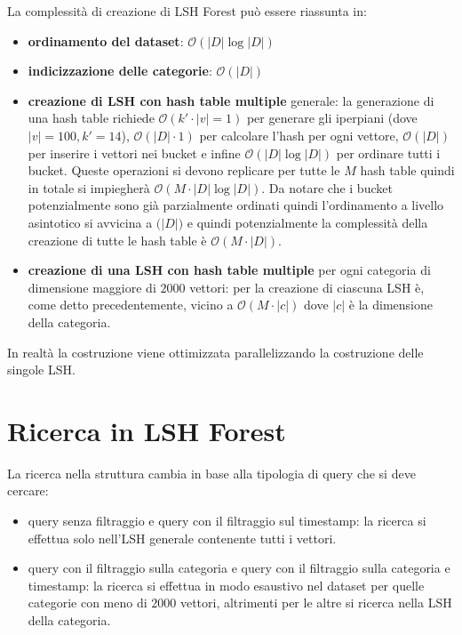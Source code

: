 La complessità di creazione di LSH Forest può essere riassunta in:
\begin{itemize}
    \item \textbf{ordinamento del dataset}: $\mathcal{O}(|D|\log |D|)$
    \item \textbf{indicizzazione delle categorie}: $\mathcal{O}(|D|)$
    \item \textbf{creazione di LSH con hash table multiple} generale: la generazione
    di una hash table richiede $\mathcal{O}(k'\cdot |v|=1)$ per generare gli iperpiani
    (dove $|v| = 100, k' = 14$), $\mathcal{O}(|D|\cdot 1)$ per calcolare l'hash per ogni vettore,
    $\mathcal{O}(|D|)$ per inserire i vettori nei bucket e infine $\mathcal{O}(|D|\log |D|)$
    per ordinare tutti i bucket. Queste operazioni si devono replicare per tutte le 
    $M$ hash table quindi in totale si impiegherà $\mathcal{O}(M\cdot |D|\log |D|)$.
    Da notare che i bucket potenzialmente sono già parzialmente ordinati quindi 
    l'ordinamento a livello asintotico si avvicina a $\mathcal(|D|)$ e quindi 
    potenzialmente la complessità della creazione di tutte le hash table è $\mathcal{O}(M\cdot |D|)$.
    \item \textbf{creazione di una LSH con hash table multiple} per ogni categoria 
    di dimensione maggiore di $2000$ vettori: per la creazione di ciascuna LSH 
    è, come detto precedentemente, vicino a $\mathcal{O}(M\cdot |c|)$ dove $|c|$
    è la dimensione della categoria.
\end{itemize}

In realtà la costruzione viene ottimizzata parallelizzando la costruzione delle 
singole LSH.

\section{Ricerca in LSH Forest}

La ricerca nella struttura cambia in base alla tipologia di query che si deve 
cercare:
\begin{itemize}
    \item query senza filtraggio e query con il filtraggio sul timestamp: la ricerca 
    si effettua solo nell'LSH generale contenente tutti i vettori.
    \item query con il filtraggio sulla categoria e query con il filtraggio sulla 
    categoria e timestamp: la ricerca si effettua in modo esaustivo nel dataset per quelle 
    categorie con meno di $2000$ vettori, altrimenti per le altre si ricerca 
    nella LSH della categoria. 
\end{itemize}

